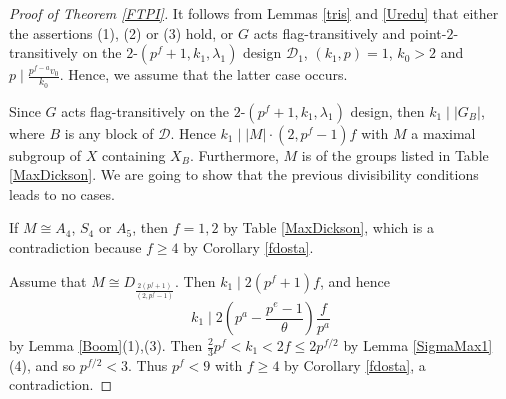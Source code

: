 \documentclass[a4paper,twopage,reqno,12pt]{amsart}
\theoremstyle{definition}
\numberwithin{equation}{section}
\renewcommand{\leq}{\leqslant}
\renewcommand{\geq}{\geqslant}
\begin{document}
\begin{proof}[Proof of Theorem \ref{FTPI}]
It follows from Lemmas \ref{tris} and \ref{Uredu} that either the assertions (1), (2) or (3) hold, or $G$ acts flag-transitively and point-$2$-transitively on the $2$-$(p^{f}+1,k_{1},\lambda_{1})$ design $\mathcal{D}_{1}$, $(k_1,p)=1$, $k_{0}>2$ and $p\mid \frac{p^{f-a}v_0}{k_0}$. Hence, we assume that the latter case occurs.

Since $G$ acts flag-transitively on the $2$-$(p^{f}+1,k_{1},\lambda_{1})$ design, then $k_{1}\mid \left\vert G_{B}\right\vert $, where $B$ is any block of $\mathcal{D}$. Hence $k_{1}\mid \left\vert M \right\vert \cdot (2,p^{f}-1)f$ with $M$ a maximal subgroup of $X$ containing $X_{B}$. Furthermore, $M$ is of the groups listed in Table \ref{MaxDickson}. We are going to show that the previous divisibility conditions leads to no cases. 

If $M\cong A_{4}$, $S_4$ or $A_5$, then $f=1,2$ by Table \ref{MaxDickson}, which is a contradiction because $f\geq 4$ by Corollary \ref{fdosta}.

Assume that $M \cong D_{\frac{2(p^{f}+1)}{(2,p^{f}-1)}}$. Then $k_{1} \mid 2(p^{f}+1)f$, and hence 
\[
k_{1}\mid 2\left( p^{a}-\frac{p^{e}-1}{\theta }\right) \frac{f}{p^{a}} 
\]%
by Lemma \ref{Boom}(1),(3). Then $\frac{2}{3}p^{f}<k_{1}<2f\leq 2p^{f/2}$ by
Lemma \ref{SigmaMax1}(4), and so $p^{f/2}<3$. Thus $p^{f}<9$ with $f\geq 4$
by Corollary \ref{fdosta}, a contradiction.


\end{proof}
\end{document}
